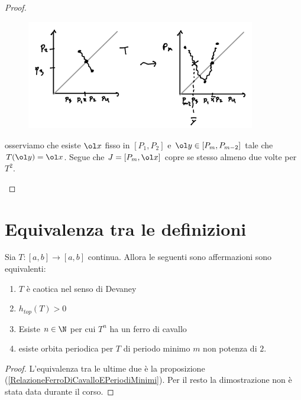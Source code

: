 \begin{proof}
\begin{enumerate}
\begin{figure}[!htb]
	\centering
	\includegraphics[width=10cm]{Immagini/Ferro_di_cavallo_2.png}
\end{figure}

osserviamo che esiste $\ol x$ fisso in $[P_1,P_2]$ e $\ol y\in [P_{m},P_{m-2}]$ tale che $T(\ol y)=\ol x$. Segue che $J=[P_m,\ol x]$ copre se stesso almeno due volte per $T^2$.
\end{enumerate}
\setlength{\leftmargini}{0.5cm}
\end{proof}

\section*{Equivalenza tra le definizioni}
\begin{theorem}\label{CaratterizzazioneCaos}
Sia $T:[a,b]\to [a,b]$ continua. Allora le seguenti sono affermazioni sono equivalenti:
\begin{enumerate}
\item $T$ \`e caotica nel senso di Devaney
\item $h_{top}(T)>0$
\item Esiste $n\in\N$ per cui $T^n$ ha un ferro di cavallo
\item esiste orbita periodica per $T$ di periodo minimo $m$ non potenza di $2$.
\end{enumerate}
\end{theorem}
\begin{proof}
L'equivalenza tra le ultime due \`e la proposizione (\ref{RelazioneFerroDiCavalloEPeriodiMinimi}). Per il resto la dimostrazione non \`e stata data durante il corso.
\end{proof}

